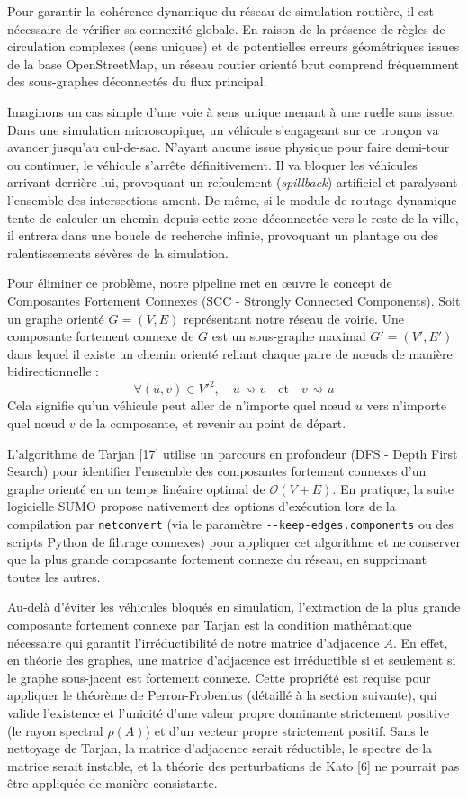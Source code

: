 \documentclass[10pt, a4paper]{article}
\begin{document}
Pour garantir la cohérence dynamique du réseau de simulation routière,
il est nécessaire de vérifier sa connexité globale. En raison de la
présence de règles de circulation complexes (sens uniques) et de
potentielles erreurs géométriques issues de la base OpenStreetMap, un
réseau routier orienté brut comprend fréquemment des sous-graphes
déconnectés du flux principal.

Imaginons un cas simple d'une voie à sens unique menant à une ruelle
sans issue. Dans une simulation microscopique, un véhicule s'engageant
sur ce tronçon va avancer jusqu'au cul-de-sac. N'ayant aucune issue
physique pour faire demi-tour ou continuer, le véhicule s'arrête
définitivement. Il va bloquer les véhicules arrivant derrière lui,
provoquant un refoulement (\emph{spillback}) artificiel et paralysant
l'ensemble des intersections amont. De même, si le module de routage
dynamique tente de calculer un chemin depuis cette zone déconnectée vers
le reste de la ville, il entrera dans une boucle de recherche infinie,
provoquant un plantage ou des ralentissements sévères de la simulation.

Pour éliminer ce problème, notre pipeline met en œuvre le concept de
Composantes Fortement Connexes (SCC - Strongly Connected Components).
Soit un graphe orienté \(G = (V, E)\) représentant notre réseau de
voirie. Une composante fortement connexe de \(G\) est un sous-graphe
maximal \(G' = (V', E')\) dans lequel il existe un chemin orienté
reliant chaque paire de nœuds de manière bidirectionnelle :
\[\forall (u, v) \in V'^2, \quad u \rightsquigarrow v \quad \text{et} \quad v \rightsquigarrow u\]
Cela signifie qu'un véhicule peut aller de n'importe quel nœud \(u\)
vers n'importe quel nœud \(v\) de la composante, et revenir au point de
départ.

L'algorithme de Tarjan {[}17{]} utilise un parcours en profondeur (DFS -
Depth First Search) pour identifier l'ensemble des composantes fortement
connexes d'un graphe orienté en un temps linéaire optimal de
\(\mathcal{O}(V + E)\). En pratique, la suite logicielle SUMO propose
nativement des options d'exécution lors de la compilation par
\texttt{netconvert} (via le paramètre \texttt{-\/-keep-edges.components}
ou des scripts Python de filtrage connexes) pour appliquer cet
algorithme et ne conserver que la plus grande composante fortement
connexe du réseau, en supprimant toutes les autres.

Au-delà d'éviter les véhicules bloqués en simulation, l'extraction de la
plus grande composante fortement connexe par Tarjan est la condition
mathématique nécessaire qui garantit l'irréductibilité de notre matrice
d'adjacence \(A\). En effet, en théorie des graphes, une matrice
d'adjacence est irréductible si et seulement si le graphe sous-jacent
est fortement connexe. Cette propriété est requise pour appliquer le
théorème de Perron-Frobenius (détaillé à la section suivante), qui
valide l'existence et l'unicité d'une valeur propre dominante
strictement positive (le rayon spectral \(\rho(A)\)) et d'un vecteur
propre strictement positif. Sans le nettoyage de Tarjan, la matrice
d'adjacence serait réductible, le spectre de la matrice serait instable,
et la théorie des perturbations de Kato {[}6{]} ne pourrait pas être
appliquée de manière consistante.
\end{document}
